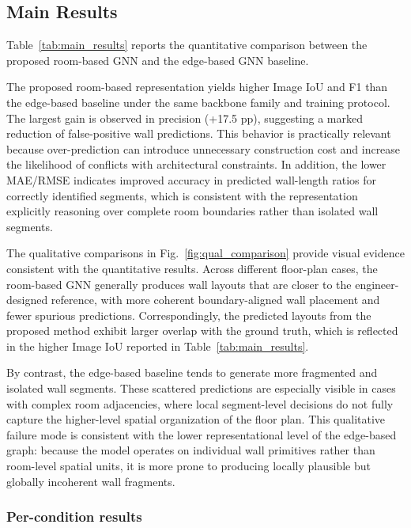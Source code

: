 \subsection{Main Results}
\label{subsec:main_results}

Table~\ref{tab:main_results} reports the quantitative comparison between the proposed room-based GNN and the edge-based GNN baseline.



The proposed room-based representation yields higher Image IoU and F1 than the edge-based baseline under the same backbone family and training protocol. The largest gain is observed in precision (+17.5 pp), suggesting a marked reduction of false-positive wall predictions. This behavior is practically relevant because over-prediction can introduce unnecessary construction cost and increase the likelihood of conflicts with architectural constraints. In addition, the lower MAE/RMSE indicates improved accuracy in predicted wall-length ratios for correctly identified segments, which is consistent with the representation explicitly reasoning over complete room boundaries rather than isolated wall segments.

The qualitative comparisons in Fig.~\ref{fig:qual_comparison} provide visual evidence consistent with the quantitative results. Across different floor-plan cases, the room-based GNN generally produces wall layouts that are closer to the engineer-designed reference, with more coherent boundary-aligned wall placement and fewer spurious predictions. Correspondingly, the predicted layouts from the proposed method exhibit larger overlap with the ground truth, which is reflected in the higher Image IoU reported in Table~\ref{tab:main_results}.

By contrast, the edge-based baseline tends to generate more fragmented and isolated wall segments. These scattered predictions are especially visible in cases with complex room adjacencies, where local segment-level decisions do not fully capture the higher-level spatial organization of the floor plan. This qualitative failure mode is consistent with the lower representational level of the edge-based graph: because the model operates on individual wall primitives rather than room-level spatial units, it is more prone to producing locally plausible but globally incoherent wall fragments.



\subsubsection{Per-condition results}

